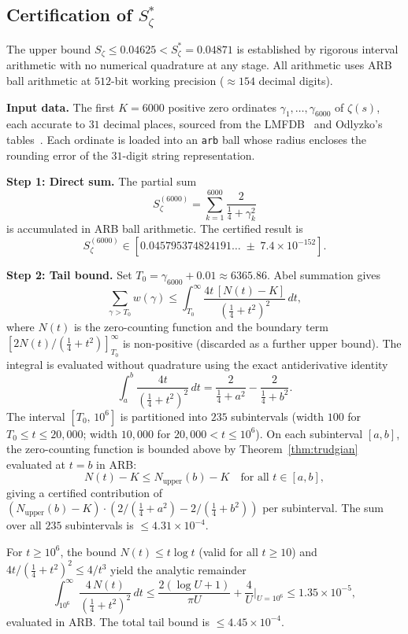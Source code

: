 \documentclass[12pt,reqno]{amsart}
\theoremstyle{plain}
\theoremstyle{definition}
\theoremstyle{remark}
\newcommand{\quarter}{\tfrac{1}{4}}
\begin{document}
\subsection{Certification of \texorpdfstring{$S_\zeta^*$}{S\_zeta*}}\label{subsec:cert-Szeta}

The upper bound $S_\zeta \leq 0.04625 < S_\zeta^* = 0.04871$ is established
by rigorous interval arithmetic with no numerical quadrature at any stage.
All arithmetic uses ARB ball arithmetic at $512$-bit working precision
($\approx 154$ decimal digits).

\medskip\noindent\textbf{Input data.}
The first $K = 6000$ positive zero ordinates $\gamma_1,\ldots,\gamma_{6000}$
of $\zeta(s)$, each accurate to $31$ decimal places, sourced from the
LMFDB~\cite{LMFDB} and Odlyzko's tables~\cite{Odlyzko}.  Each ordinate is
loaded into an \texttt{arb} ball whose radius encloses the rounding error of
the $31$-digit string representation.

\medskip\noindent\textbf{Step 1: Direct sum.}
The partial sum
\[
  S_\zeta^{(6000)} = \sum_{k=1}^{6000} \frac{2}{\quarter + \gamma_k^2}
\]
is accumulated in ARB ball arithmetic.  The certified result is
\[
  S_\zeta^{(6000)} \in [0.045795374824191\ldots \;\pm\; 7.4\times 10^{-152}].
\]

\medskip\noindent\textbf{Step 2: Tail bound.}
Set $T_0 = \gamma_{6000} + 0.01 \approx 6365.86$.  Abel summation gives
\[
  \sum_{\gamma > T_0} w(\gamma)
  \leq \int_{T_0}^{\infty} \frac{4t\,[N(t) - K]}{(\quarter + t^2)^2}\,dt,
\]
where $N(t)$ is the zero-counting function and the boundary term
$[2N(t)/(\quarter+t^2)]_{T_0}^\infty$ is non-positive (discarded as a
further upper bound).  The integral is evaluated without quadrature using
the exact antiderivative identity
\[
  \int_a^b \frac{4t}{(\quarter + t^2)^2}\,dt
  = \frac{2}{\quarter + a^2} - \frac{2}{\quarter + b^2}.
\]
The interval $[T_0,\, 10^6]$ is partitioned into $235$ subintervals
(width $100$ for $T_0 \leq t \leq 20{,}000$; width $10{,}000$ for
$20{,}000 < t \leq 10^6$).  On each subinterval $[a,b]$, the
zero-counting function is bounded above by Theorem~\ref{thm:trudgian}
evaluated at $t = b$ in ARB:
\[
  N(t) - K \leq N_{\mathrm{upper}}(b) - K
  \quad\text{for all } t \in [a,b],
\]
giving a certified contribution of $(N_{\mathrm{upper}}(b) - K) \cdot
(2/(\quarter+a^2) - 2/(\quarter+b^2))$ per subinterval.  The sum over
all $235$ subintervals is $\leq 4.31 \times 10^{-4}$.

For $t \geq 10^6$, the bound $N(t) \leq t\log t$ (valid for all
$t \geq 10$) and $4t/(\quarter+t^2)^2 \leq 4/t^3$ yield the analytic
remainder
\[
  \int_{10^6}^{\infty} \frac{4\,N(t)}{(\quarter+t^2)^2}\,dt
  \leq \frac{2(\log U + 1)}{\pi U} + \frac{4}{U}\bigg|_{U=10^6}
  \leq 1.35 \times 10^{-5},
\]
evaluated in ARB.  The total tail bound is $\leq 4.45 \times 10^{-4}$.
\end{document}
